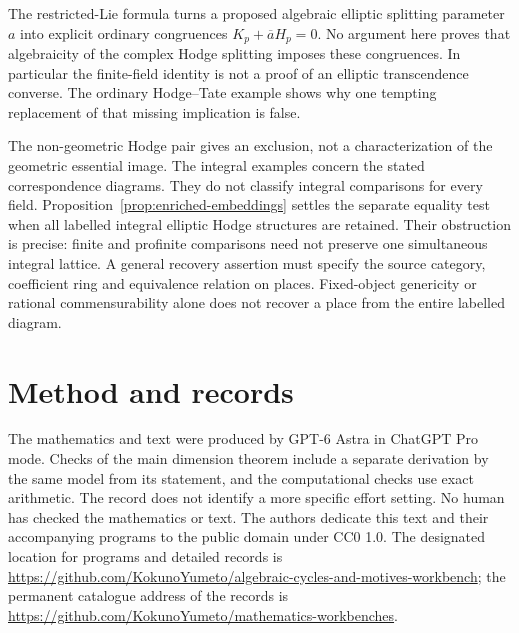 \documentclass[11pt]{article}
\theoremstyle{definition}\newtheorem{definition}[theorem]{Definition}
\theoremstyle{remark}\newtheorem{remark}[theorem]{Remark}
\newcommand{\workbenchurl}{https://github.com/KokunoYumeto/algebraic-cycles-and-motives-workbench}
\newcommand{\recordurl}{https://github.com/KokunoYumeto/mathematics-workbenches}
\begin{document}
The restricted-Lie formula turns a proposed algebraic elliptic splitting parameter $a$ into explicit ordinary congruences $K_p+\overline aH_p=0$. No argument here proves that algebraicity of the complex Hodge splitting imposes these congruences. In particular the finite-field identity is not a proof of an elliptic transcendence converse. The ordinary Hodge--Tate example shows why one tempting replacement of that missing implication is false.

The non-geometric Hodge pair gives an exclusion, not a characterization of the geometric essential image. The integral examples concern the stated correspondence diagrams. They do not classify integral comparisons for every field. Proposition~\ref{prop:enriched-embeddings} settles the separate equality test when all labelled integral elliptic Hodge structures are retained. Their obstruction is precise: finite and profinite comparisons need not preserve one simultaneous integral lattice. A general recovery assertion must specify the source category, coefficient ring and equivalence relation on places. Fixed-object genericity or rational commensurability alone does not recover a place from the entire labelled diagram.

\section*{Method and records}
The mathematics and text were produced by GPT-6 Astra in ChatGPT Pro mode. Checks of the main dimension theorem include a separate derivation by the same model from its statement, and the computational checks use exact arithmetic. The record does not identify a more specific effort setting. No human has checked the mathematics or text. The authors dedicate this text and their accompanying programs to the public domain under CC0 1.0. The designated location for programs and detailed records is \expandafter\url\expandafter{\workbenchurl}; the permanent catalogue address of the records is \expandafter\url\expandafter{\recordurl}.
\end{document}
